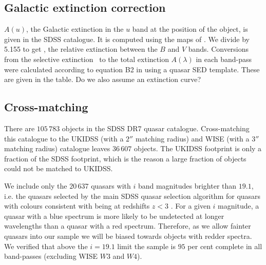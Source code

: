 

\subsection{Galactic extinction correction}


$A(u)$, the Galactic extinction in the $u$ band at the position of the object, is given in the SDSS catalogue. 
It is computed using the maps of \citet{schlegel98}. 
We divide by 5.155 to get \ebv, the relative extinction between the $B$ and $V$ bands. 
Conversions from the selective extinction \ebv\, to the total extinction $A(\lambda)$ in each band-pass were calculated according to equation B2 in \citet{schlegel98} using a quasar SED template. 
These are given in the table. 
Do we also assume an extinction curve? 


\subsection{Cross-matching}

There are $105\,783$ objects in the SDSS DR7 quasar catalogue. 
Cross-matching this catalogue to the UKIDSS (with a $2''$ matching radius) and WISE (with a $3$$''$ matching radius) catalogue leaves $36\,607$ objects. 
The UKIDSS footprint is only a fraction of the SDSS footprint, which is the reason a large fraction of objects could not be matched to UKIDSS.

We include only the $20\,637$ quasars with $i$ band magnitudes brighter than $19.1$, i.e. the quasars selected by the main SDSS quasar selection algorithm for quasars with colours consistent with being at redshifts $z < 3$ \citep{richards02}. 
For a given $i$ magnitude, a quasar with a blue spectrum is more likely to be undetected at longer wavelengths than a quasar with a red spectrum. 
Therefore, as we allow fainter quasars into our sample we will be biased towards objects with redder spectra.
We verified that above the $i=19.1$ limit the sample is $95$ per cent complete in all band-passes (excluding WISE $W3$ and $W4$).

